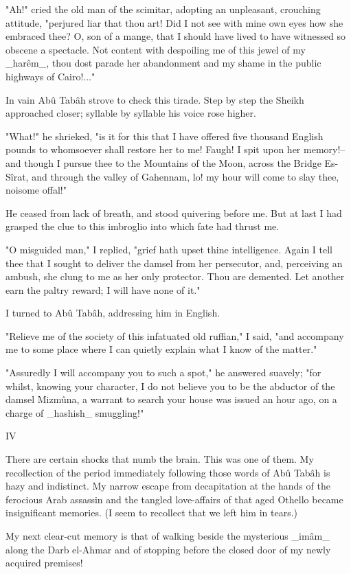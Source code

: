 "Ah!" cried the old man of the scimitar, adopting an unpleasant,
crouching attitude, "perjured liar that thou art! Did I not see with
mine own eyes how she embraced thee? O, son of a mange, that I should
have lived to have witnessed so obscene a spectacle. Not content with
despoiling me of this jewel of my _harêm_, thou dost parade her
abandonment and my shame in the public highways of Cairo!..."

In vain Abû Tabâh strove to check this tirade. Step by step the Sheikh
approached closer; syllable by syllable his voice rose higher.

"What!" he shrieked, "is it for this that I have offered five thousand
English pounds to whomsoever shall restore her to me! Faugh! I spit
upon her memory!--and though I pursue thee to the Mountains of the
Moon, across the Bridge Es-Sîrat, and through the valley of Gahennam,
lo! my hour will come to slay thee, noisome offal!"

He ceased from lack of breath, and stood quivering before me. But at
last I had grasped the clue to this imbroglio into which fate had
thrust me.

"O misguided man," I replied, "grief hath upset thine intelligence.
Again I tell thee that I sought to deliver the damsel from her
persecutor, and, perceiving an ambush, she clung to me as her only
protector. Thou are demented. Let another earn the paltry reward;
I will have none of it."

I turned to Abû Tabâh, addressing him in English.

"Relieve me of the society of this infatuated old ruffian," I said,
"and accompany me to some place where I can quietly explain what I
know of the matter."

"Assuredly I will accompany you to such a spot," he answered suavely;
"for whilst, knowing your character, I do not believe you to be the
abductor of the damsel Mizmûna, a warrant to search your house was
issued an hour ago, on a charge of _hashish_ smuggling!"


IV

There are certain shocks that numb the brain. This was one of them.
My recollection of the period immediately following those words of Abû
Tabâh is hazy and indistinct. My narrow escape from decapitation at
the hands of the ferocious Arab assassin and the tangled love-affairs
of that aged Othello became insignificant memories. (I seem to
recollect that we left him in tears.)

My next clear-cut memory is that of walking beside the mysterious
_imâm_ along the Darb el-Ahmar and of stopping before the closed door
of my newly acquired premises!

